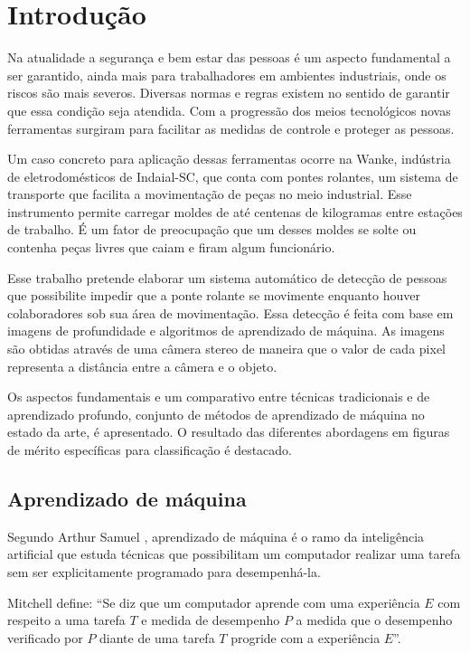 \chapter{Introdução}

Na atualidade a segurança e bem estar das pessoas é um aspecto fundamental a ser garantido, ainda mais para trabalhadores em ambientes industriais, onde os riscos são mais severos. Diversas normas e regras existem no sentido de garantir que essa condição seja atendida. Com a progressão dos meios tecnológicos novas ferramentas surgiram para facilitar as medidas de controle e proteger as pessoas.

Um caso concreto para aplicação dessas ferramentas ocorre na Wanke, indústria de eletrodomésticos de Indaial-SC, que conta com pontes rolantes, um sistema de transporte que facilita a movimentação de peças no meio industrial. Esse instrumento permite carregar moldes de até centenas de kilogramas entre estações de trabalho. É um fator de preocupação que um desses moldes se solte ou contenha peças livres que caiam e firam algum funcionário. 

Esse trabalho pretende elaborar um sistema automático de detecção de pessoas que possibilite impedir que a ponte rolante se movimente enquanto houver colaboradores sob sua área de movimentação. Essa detecção é feita com base em imagens de profundidade e algoritmos de aprendizado de máquina. As imagens são obtidas através de uma câmera stereo de maneira que o valor de cada pixel representa a distância entre a câmera e o objeto. 

Os aspectos fundamentais e um comparativo entre técnicas tradicionais e de aprendizado profundo, conjunto de métodos de aprendizado de máquina no estado da arte, é apresentado. O resultado das diferentes abordagens em figuras de mérito específicas para classificação é destacado.

\section{Aprendizado de máquina}
Segundo Arthur Samuel \cite{Samuel59somestudies}, aprendizado de máquina é o ramo da inteligência artificial que estuda técnicas que possibilitam um computador realizar uma tarefa sem ser explicitamente programado para desempenhá-la. 

Mitchell \cite{Mitchell:ML} define: ``Se diz que um computador aprende com uma experiência $E$ com respeito a uma tarefa $T$ e medida de desempenho $P$ a medida que o desempenho verificado por $P$ diante de uma tarefa $T$ progride com a experiência $E$''. 

